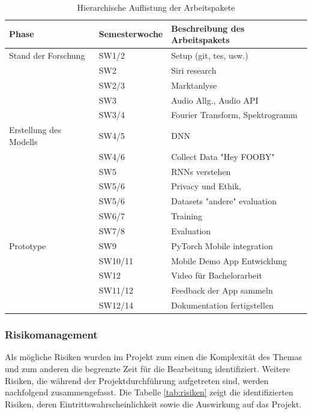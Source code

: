 \documentclass[main.tex]{subfiles} %
\begin{document}
\begin{table}[ht]
    \centering
    \begin{tabularx}{\textwidth}{llX}
    \toprule
    \textbf{Phase} & \textbf{Semesterwoche} & \textbf{Beschreibung des Arbeitspakets} \\
    \midrule
    Stand der Forschung     & SW1/2  & Setup (git, tes, usw.) \\
                            & SW2    & Siri research  \\
                            & SW2/3  & Marktanlyse \\
                            & SW3    & Audio Allg., Audio API \\
                            & SW3/4  & Fourier Transform, Spektrogramm \\
    \addlinespace
    Erstellung des Modells  & SW4/5  & DNN \\
                            & SW4/6  & Collect Data "Hey FOOBY" \\
                            & SW5    & RNNs verstehen \\
                            & SW5/6  & Privacy und Ethik,  \\
                            & SW5/6  & Datasets "andere" evaluation \\
                            & SW6/7  & Training \\
                            & SW7/8  & Evaluation \\
    \addlinespace
    Prototype               & SW9       & PyTorch Mobile integration \\ 
                            & SW10/11   & Mobile Demo App Entwicklung \\
                            & SW12      & Video für Bachelorarbeit \\
                            & SW11/12   & Feedback der App sammeln \\
                            & SW12/14   & Dokumentation fertigstellen \\

    \bottomrule
    \end{tabularx}
    \caption{Hierarchische Auflistung der Arbeitspakete}
    \label{fig:backlog_table}
\end{table}



\subsubsection{Risikomanagement}
Als mögliche Risiken wurden im Projekt zum einen die Komplexität des Themas und zum anderen die
begrenzte Zeit für die Bearbeitung identifiziert. Weitere Risiken, die während der 
Projektdurchführung aufgetreten sind, werden nachfolgend zusammengefasst. Die Tabelle 
\ref{tab:risiken} zeigt die identifizierten Risiken, deren Eintrittswahrscheinlichkeit sowie die 
Auswirkung auf das Projekt.
\end{document}
